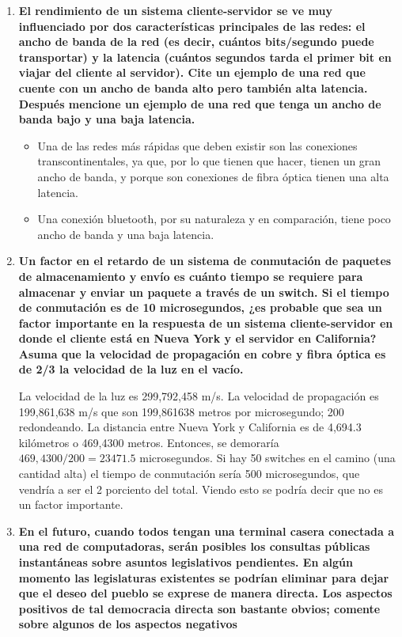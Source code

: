 \documentclass[a4paper,12pt]{article}
\begin{document}
\begin{enumerate}
 \item \textbf{El rendimiento de un sistema cliente-servidor se ve muy influenciado por dos características principales de las
redes: el ancho de banda de la red (es decir, cuántos bits/segundo puede transportar) y la latencia (cuántos segundos
tarda el primer bit en viajar del cliente al servidor). Cite un ejemplo de una red que cuente con un ancho
de banda alto pero también alta latencia. Después mencione un ejemplo de una red que tenga un ancho de banda
bajo y una baja latencia.}

\begin{itemize}
 \item Una de las redes más rápidas que deben existir son las conexiones transcontinentales, ya que, por lo que tienen que hacer, tienen un gran ancho de banda, y porque son
 conexiones de fibra óptica tienen una alta latencia.
 \item Una conexión bluetooth, por su naturaleza y en comparación, tiene poco ancho de banda y una baja latencia.
\end{itemize}

 \item \textbf{Un factor en el retardo de un sistema de conmutación de paquetes de almacenamiento y envío es cuánto tiempo
se requiere para almacenar y enviar un paquete a través de un switch. Si el tiempo de conmutación es de
10 microsegundos, ¿es probable que sea un factor importante en la respuesta de un sistema cliente-servidor en donde el
cliente está en Nueva York y el servidor en California? Asuma que la velocidad de propagación en cobre y fibra
óptica es de 2/3 la velocidad de la luz en el vacío.}

La velocidad de la luz es 299,792,458 m/s. La velocidad de propagación es 199,861,638 m/s que son 199,861638 metros por microsegundo; 200 redondeando.
La distancia entre Nueva York y California es de 4,694.3 kilómetros o 469,4300 metros. Entonces, se demoraría $469,4300 / 200 = 23471.5$ microsegundos.
Si hay 50 switches en el camino (una cantidad alta) el tiempo de conmutación sería 500 microsegundos, que vendría a ser el 2 porciento del total. Viendo esto se
podría decir que no es un factor importante.

 \item \textbf{En el futuro, cuando todos tengan una terminal casera conectada a una red de computadoras, serán posibles
los consultas públicas instantáneas sobre asuntos legislativos pendientes. En algún momento las legislaturas
existentes se podrían eliminar para dejar que el deseo del pueblo se exprese de manera directa. Los aspectos
positivos de tal democracia directa son bastante obvios; comente sobre algunos de los aspectos negativos}


\end{enumerate}
\end{document}
